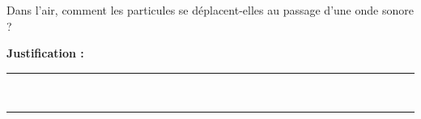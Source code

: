 Dans l'air, comment les particules se déplacent-elles au passage d'une onde sonore ?

\choices

\noindent\textbf{Justification :} \hrulefill \\[2.5ex]
\rule{\linewidth}{0.4pt} \\[2.5ex]
\rule{\linewidth}{0.4pt}
\vfill
